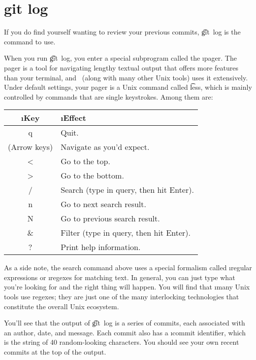 \documentclass[letterpaper,12pt,titlepage,twoside]{article}
\begin{document}
\section{git log}

If you do find yourself wanting to review your previous commits, \t{git~log}
is the command to use.


When you run \t{git~log}, you enter a special subprogram called the \i{pager}.
The pager is a tool for navigating lengthy textual output that offers more
features than your terminal, and \git\ (along with many other Unix tools) uses
it extensively. Under default settings, your pager is a Unix command called
\t{less}, which is mainly controlled by commands that are single keystrokes.
Among them are:

\begin{center}
\begin{tabular}{>{\ttfamily}cl}
\rmfamily\i{Key} & \i{Effect} \\ \hline
q & Quit. \\
\rmfamily(Arrow keys) & Navigate as you'd expect. \\
< & Go to the top. \\
> & Go to the bottom. \\
/ & Search (type in query, then hit Enter). \\
n & Go to next search result. \\
N & Go to previous search result. \\
\& & Filter (type in query, then hit Enter). \\
? & Print help information.
\end{tabular}
\end{center}

As a side note, the search command above uses a special formalism called
\i{regular expressions} or \i{regexes} for matching text. In general, you can
just type what you're looking for and the right thing will happen. You will
find that \i{many} Unix tools use regexes; they are just one of the many
interlocking technologies that constitute the overall Unix ecosystem.

You'll see that the output of \t{git~log} is a series of commits, each
associated with an author, date, and message. Each commit also has a \i{commit
  identifier}, which is the string of 40 random-looking characters. You should
see your own recent commits at the top of the output.
\end{document}
